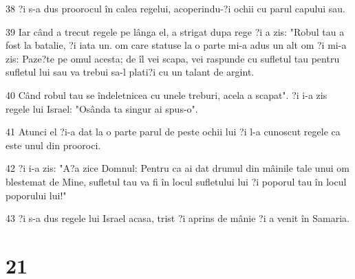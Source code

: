 \par 38 ?i s-a dus proorocul în calea regelui, acoperindu-?i ochii cu parul capului sau.
\par 39 Iar când a trecut regele pe lânga el, a strigat dupa rege ?i a zis: "Robul tau a fost la batalie, ?i iata un. om care statuse la o parte mi-a adus un alt om ?i mi-a zis: Paze?te pe omul acesta; de îl vei scapa, vei raspunde cu sufletul tau pentru sufletul lui sau va trebui sa-l plati?i cu un talant de argint.
\par 40 Când robul tau se îndeletnicea cu unele treburi, acela a scapat". ?i i-a zis regele lui Israel: "Osânda ta singur ai spus-o".
\par 41 Atunci el ?i-a dat la o parte parul de peste ochii lui ?i l-a cunoscut regele ca este unul din prooroci.
\par 42 ?i i-a zis: "A?a zice Domnul: Pentru ca ai dat drumul din mâinile tale unui om blestemat de Mine, sufletul tau va fi în locul sufletului lui ?i poporul tau în locul poporului lui!"
\par 43 ?i s-a dus regele lui Israel acasa, trist ?i aprins de mânie ?i a venit în Samaria.

\chapter{21}


